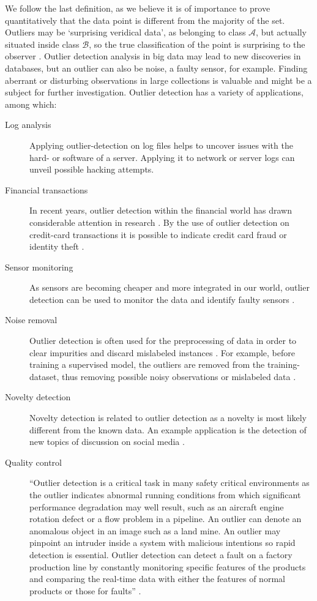 We follow the last definition, as we believe it is of importance to prove quantitatively that the data point is different from the majority of the set. Outliers may be `surprising veridical data', as belonging to class $\mathcal{A}$, but actually situated inside class $\mathcal{B}$, so the true classification of the point is surprising to the observer \cite{John95robustdecision}. Outlier detection analysis in big data may lead to new discoveries in databases, but an outlier can also be noise, a faulty sensor, for example. Finding aberrant or disturbing observations in large collections is valuable and might be a subject for further investigation. Outlier detection has a variety of applications, among which:

\begin{description}
  \item[Log analysis] Applying outlier-detection on log files helps to uncover issues with the hard- or software of a server. Applying it to network or server logs can unveil possible hacking attempts. 
  \item[Financial transactions] In recent years, outlier detection within the financial world has drawn considerable attention in research \cite{Kanhere2014}. By the use of outlier detection on credit-card transactions it is possible to indicate credit card fraud or identity theft \cite{618940}.
  \item[Sensor monitoring] As sensors are becoming cheaper and more integrated in our world, outlier detection can be used to monitor the data and identify faulty sensors \cite{Fujimaki:2005:ASA:1081870.1081917}.
  \item[Noise removal] Outlier detection is often used for the preprocessing of data in order to clear impurities and discard mislabeled instances \cite{Brodley96identifyingand}. For example, before training a supervised model, the outliers are removed from the training-dataset, thus removing possible noisy observations or mislabeled data \cite{63857}.
  \item[Novelty detection] Novelty detection is related to outlier detection as a novelty is most likely different from the known data. An example application is the detection of new topics of discussion on social media \cite{Markou20032481,Markou20032499,SPC3:SPC3353}.
  \item[Quality control] ``Outlier detection is a critical task in many safety critical environments as the outlier indicates abnormal running conditions from which significant performance degradation may well result, such as an aircraft engine rotation defect or a flow problem in a pipeline. An outlier can denote an anomalous object in an image such as a land mine. An outlier may pinpoint an intruder inside a system with malicious intentions so rapid detection is essential. Outlier detection can detect a fault on a factory production line by constantly monitoring specific features of the products and comparing the real-time data with either the features of normal products or those for faults'' \cite{6416666}.
\end{description}

